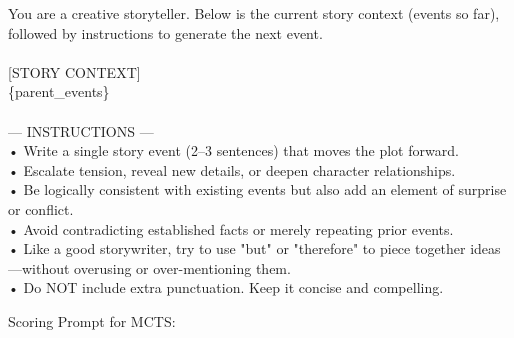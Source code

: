 \documentclass[11pt]{article}
\begin{document}
\begin{small}
\begin{tcolorbox}[colback=gray!10, colframe=gray!40, arc=4mm, boxrule=0pt]
You are a creative storyteller. Below is the current story context (events so far), followed by instructions to generate the next event. \\
\\
{[}STORY CONTEXT{]} \\
\{parent\_events\} \\
\\
--- INSTRUCTIONS --- \\
• Write a single story event (2–3 sentences) that moves the plot forward.\\
• Escalate tension, reveal new details, or deepen character relationships.\\
• Be logically consistent with existing events but also add an element of surprise or conflict.\\
• Avoid contradicting established facts or merely repeating prior events.\\
• Like a good storywriter, try to use "but" or "therefore" to piece together ideas—without overusing or over-mentioning them.\\
• Do NOT include extra punctuation. Keep it concise and compelling.\\
\end{tcolorbox}
\end{small}

\noindent
Scoring Prompt for MCTS:
\end{document}
